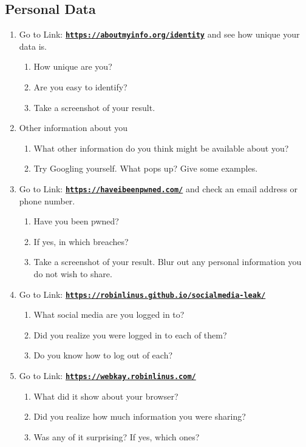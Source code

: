 \documentclass[12pt]{article}
\begin{document}
\subsection*{Personal Data}
    \begin{enumerate}
        \item Go to Link: \href{https://aboutmyinfo.org/identity}{\textbf{\nolinkurl{https://aboutmyinfo.org/identity}}} and see how unique your data is.
        \begin{enumerate}
            \item How unique are you?
            \item Are you easy to identify?
            \item Take a screenshot of your result.
        \end{enumerate}
        \item Other information about you
        \begin{enumerate}
            \item What other information do you think might be available about you?
            \item Try Googling yourself. What pops up? Give some examples.
        \end{enumerate}
        \item Go to Link: \href{https://haveibeenpwned.com/}{\textbf{\nolinkurl{https://haveibeenpwned.com/}}} and check an email address or phone number.
        \begin{enumerate}
            \item Have you been pwned?
            \item If yes, in which breaches?
            \item Take a screenshot of your result. Blur out any personal information you do not wish to share.
        \end{enumerate}
        \item Go to Link: \href{https://robinlinus.github.io/socialmedia-leak/}{\textbf{\nolinkurl{https://robinlinus.github.io/socialmedia-leak/}}}
        \begin{enumerate}
            \item What social media are you logged in to?
            \item Did you realize you were logged in to each of them?
            \item Do you know how to log out of each?
        \end{enumerate}
        \item Go to Link: \href{https://webkay.robinlinus.com/}{\textbf{\nolinkurl{https://webkay.robinlinus.com/}}}
        \begin{enumerate}
            \item What did it show about your browser?
            \item Did you realize how much information you were sharing?
            \item Was any of it surprising? If yes, which ones?
        \end{enumerate}
    \end{enumerate}
\end{document}
